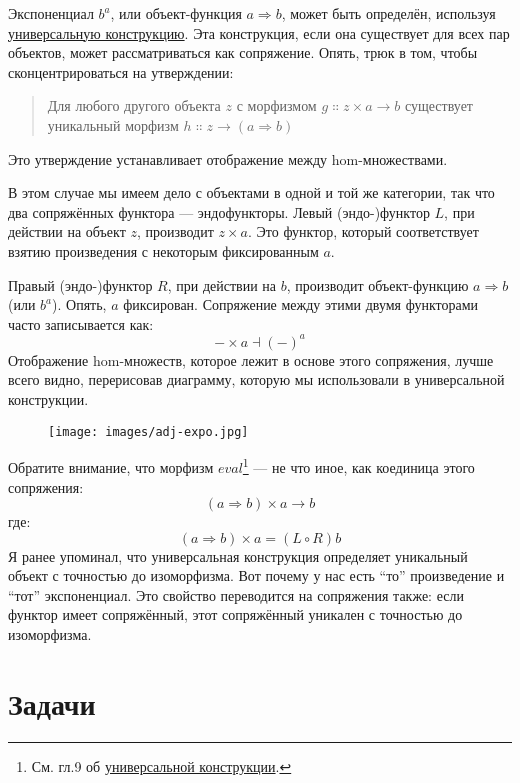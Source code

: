 Экспоненциал $b^a$, или объект-функция $a \Rightarrow b$, может быть
определён, используя \hyperref[function-types]{универсальную
  конструкцию}. Эта конструкция, если она существует для всех пар объектов,
может рассматриваться как сопряжение. Опять, трюк в том, чтобы сконцентрироваться на
утверждении:

\begin{quote}
  Для любого другого объекта $z$ с морфизмом $g \Colon z\times{}a \to b$
  существует уникальный морфизм $h \Colon z \to (a \Rightarrow b)$
\end{quote}
Это утверждение устанавливает отображение между hom-множествами.

В этом случае мы имеем дело с объектами в одной и той же категории, так что
два сопряжённых функтора --- эндофункторы. Левый (эндо-)функтор
$L$, при действии на объект $z$, производит $z\times{}a$.
Это функтор, который соответствует взятию произведения с некоторым фиксированным
$a$.

Правый (эндо-)функтор $R$, при действии на $b$, производит
объект-функцию $a \Rightarrow b$ (или $b^a$). Опять, $a$
фиксирован. Сопряжение между этими двумя функторами часто записывается как:
\[-\times{}a \dashv (-)^a\]
Отображение hom-множеств, которое лежит в основе этого сопряжения, лучше всего видно,
перерисовав диаграмму, которую мы использовали в универсальной конструкции.

\begin{figure}[H]
  \centering
  \texttt{[image: images/adj-expo.jpg]}
\end{figure}

\noindent
Обратите внимание, что морфизм $\mathit{eval}$\footnote{См. гл.9 об \hyperref[function-types]{универсальной
    конструкции}.} --- не что иное, как коединица
этого сопряжения:
\[(a \Rightarrow b)\times{}a \to b\]
где:
\[(a \Rightarrow b)\times{}a = (L \circ R) b\]
Я ранее упоминал, что универсальная конструкция определяет
уникальный объект с точностью до изоморфизма. Вот почему у нас есть ``то'' произведение и
``тот'' экспоненциал. Это свойство переводится на сопряжения также: если
функтор имеет сопряжённый, этот сопряжённый уникален с точностью до изоморфизма.

\section{Задачи}

